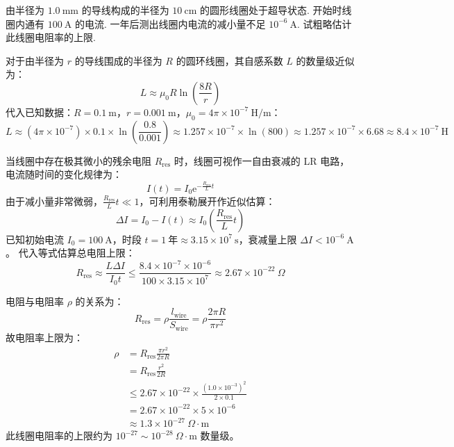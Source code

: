 \begin{exercise}\label{ex:18.10}
由半径为 $1.0 \ \mathrm{mm}$ 的导线构成的半径为 $10 \ \mathrm{cm}$ 的圆形线圈处于超导状态. 开始时线圈内通有 $100 \ \mathrm{A}$ 的电流. 一年后测出线圈内电流的减小量不足 $10^{-6} \ \mathrm{A}$. 试粗略估计此线圈电阻率的上限.
\end{exercise}
\begin{solution}
对于由半径为 $r$ 的导线围成的半径为 $R$ 的圆环线圈，其自感系数 $L$ 的数量级近似为：
$$ L \approx \mu_0 R \ln\left( \frac{8R}{r} \right) $$
代入已知数据：$R = 0.1 \ \mathrm{m}$，$r = 0.001 \ \mathrm{m}$，$\mu_0 = 4\pi \times 10^{-7} \ \mathrm{H/m}$：
$$ L \approx (4\pi \times 10^{-7}) \times 0.1 \times \ln\left( \frac{0.8}{0.001} \right) \approx 1.257 \times 10^{-7} \times \ln(800) \approx 1.257 \times 10^{-7} \times 6.68 \approx 8.4 \times 10^{-7} \ \mathrm{H} $$

当线圈中存在极其微小的残余电阻 $R_{\text{res}}$ 时，线圈可视作一自由衰减的 LR 电路，电流随时间的变化规律为：
$$ I(t) = I_0 \mathrm{e}^{-\frac{R_{\text{res}}}{L} t} $$
由于减小量非常微弱，$\frac{R_{\text{res}}}{L} t \ll 1$，可利用泰勒展开作近似估算：
$$ \Delta I = I_0 - I(t) \approx I_0 \left( \frac{R_{\text{res}}}{L} t \right) $$
已知初始电流 $I_0 = 100 \ \mathrm{A}$，时段 $t = 1 \ \text{年} \approx 3.15 \times 10^7 \ \mathrm{s}$，衰减量上限 $\Delta I < 10^{-6} \ \mathrm{A}$。
代入等式估算总电阻上限：
$$ R_{\text{res}} \approx \frac{L \Delta I}{I_0 t} \le \frac{8.4 \times 10^{-7} \times 10^{-6}}{100 \times 3.15 \times 10^7} \approx 2.67 \times 10^{-22} \ \Omega $$

电阻与电阻率 $\rho$ 的关系为：
$$ R_{\text{res}} = \rho \frac{l_{\text{wire}}}{S_{\text{wire}}} = \rho \frac{2\pi R}{\pi r^2} $$
故电阻率上限为：
\[
\begin{aligned}
\rho &= R_{\text{res}} \frac{\pi r^2}{2\pi R}\\
  &= R_{\text{res}} \frac{r^2}{2R}\\
  &\le 2.67 \times 10^{-22} \times \frac{(1.0 \times 10^{-3})^2}{2 \times 0.1}\\
  &= 2.67 \times 10^{-22} \times 5 \times 10^{-6}\\
  &\approx 1.3 \times 10^{-27} \ \Omega \cdot \mathrm{m}
\end{aligned}
\]
此线圈电阻率的上限约为 $10^{-27} \sim 10^{-28} \ \Omega \cdot \mathrm{m}$ 数量级。
\end{solution}


